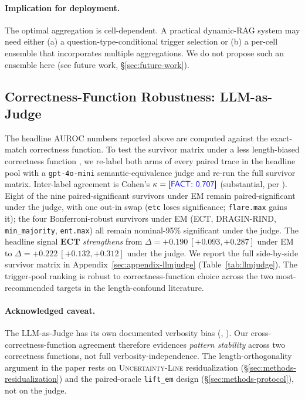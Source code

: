 \documentclass[11pt]{article}
\newcommand{\FACT}[1]{{\color{blue}\textsf{[FACT: #1]}}}
\begin{document}
\paragraph{Implication for deployment.} The optimal aggregation is
cell-dependent. A practical dynamic-RAG system may need either (a) a
question-type-conditional trigger selection or (b) a per-cell ensemble that
incorporates multiple aggregations. We do not propose such an ensemble here
(see future work, \S\ref{sec:future-work}).

\subsection{Correctness-Function Robustness: LLM-as-Judge}
\label{sec:results-llmjudge}

The headline AUROC numbers reported above are computed against the
exact-match correctness function. To test the survivor matrix under a
less length-biased correctness function
\citep{Janiak_IllusionProgressHallucinationDetection,
Santilli_RevisitingUQEvaluationLengthBias,
Ielanskyi_PitfallsUQEvaluationNLG}, we re-label both arms of every
paired trace in the headline pool with a \texttt{gpt-4o-mini}
semantic-equivalence judge and re-run the full survivor matrix.
Inter-label agreement is Cohen's $\kappa = \FACT{0.707}$ (substantial,
per \citealp{LandisKoch_Kappa}). Eight of the nine paired-significant
survivors under EM remain paired-significant under the judge, with one
out-in swap (\texttt{etc} loses significance; \texttt{flare.max} gains
it); the four Bonferroni-robust survivors under EM (ECT, DRAGIN-RIND,
\texttt{min\_majority}, \texttt{ent.max}) all remain nominal-95\%
significant under the judge. The headline signal $\textbf{ECT}$
\emph{strengthens} from $\Delta{=}+0.190~[+0.093, +0.287]$ under EM to
$\Delta{=}+0.222~[+0.132, +0.312]$ under the judge.
We report the full side-by-side survivor matrix in
Appendix~\ref{sec:appendix-llmjudge} (Table~\ref{tab:llmjudge}). The
trigger-pool ranking is robust to correctness-function choice across the
two most-recommended targets in the length-confound literature.

\paragraph{Acknowledged caveat.} The LLM-as-Judge has its own documented
verbosity bias (\citealp{Zheng_LLMasaJudge},
\citealp{Wang_NotFairEvaluators}). Our cross-correctness-function
agreement therefore evidences \emph{pattern stability} across two
correctness functions, not full verbosity-independence. The
length-orthogonality argument in the paper rests on
\textsc{Uncertainty-Line} residualization
(\S\ref{sec:methods-residualization}) and the paired-oracle
\texttt{lift\_em} design (\S\ref{sec:methods-protocol}), not on the
judge.
\end{document}
